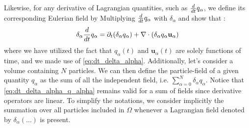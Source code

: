 Likewise, for any derivative of Lagrangian quantities, such as $\frac{d}{dt} q_\alpha$, we define its corresponding Eulerian field by Multiplying $\frac{d}{dt} q_\alpha$ with $\delta_\alpha$ and show that :
\begin{equation}
    \delta_\alpha \frac{d}{dt} q_\alpha
    = \partial_t (\delta_\alpha q_\alpha)
    + \mathbf{\nabla}\cdot (\delta_\alpha q_\alpha \textbf{u}_\alpha)
    \label{eq:dt_delta_alpha_q_alpha}
\end{equation}
where we have utilized the fact that $q_\alpha(t)$ and $\textbf{u}_\alpha(t)$ are solely functions of time, and we made use of \ref{eq:dt_delta_alpha}.
Additionally, let's consider a volume containing $N$ particles.
We can then define the particle-field of a given quantity $q_\alpha$ as the sum of all the independent field, i.e. $\sum_{\alpha=0}^N \delta_\alpha q_\alpha$.
Notice that \ref{eq:dt_delta_alpha_q_alpha} remains valid for a sum of fields since derivative operators are linear.
To simplify the notations, we consider implicitly the summation over all particles included in $\Omega$ whenever a Lagrangian field denoted by $\delta_\alpha (\ldots)$ is present.

